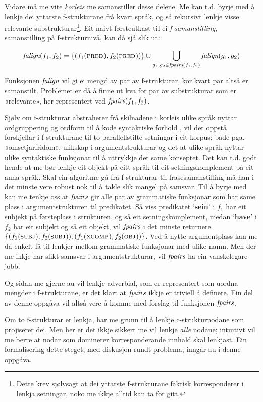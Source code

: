 \documentclass[11pt,a4paper,oneside,draft]{report}
\newcommand{\F}[2]{\textsc{#1}\ensuremath{_{#2}}}
\newcommand{\OBJ}{\F{obj}{}}
\newcommand{\XCOMP}{\F{xcomp}{}}
\newcommand{\SUBJ}{\F{subj}{}}
\newcommand{\PRED}{\F{pred}{}}
\newcommand{\falign}{\ensuremath{\operatorname{\emph{falign}}}}
\newcommand{\fpairs}{\ensuremath{\operatorname{\emph{fpairs}}}}
\newcommand{\p}[1]{`\textbf{#1}'}
\begin{document}
Vidare må me vite \emph{korleis} me samanstiller desse delene. Me kan
t.d. byrje med å lenkje dei yttarste f-strukturane frå kvart språk, og
så rekursivt lenkje visse relevante substrukturar\footnote{Dette krev sjølvsagt at dei yttarste f-strukturane faktisk
        korresponderer i lenkja setningar, noko me ikkje alltid kan ta
        for gitt. }.  Eit naivt
førsteutkast til ei \emph{f-samanstilling}, samanstilling på
f-strukturnivå, kan då sjå slik ut:


\[
\falign(f_{1}, f_{2}) =
\{ (f_{1}(\PRED), f_{2}(\PRED)) \}
\cup
\bigcup_{g_{1},g_{2}\in \fpairs(f_{1},f_{2})} \falign(g_{1}, g_{2})
\]

Funksjonen \falign{} vil gi ei mengd av par av f-strukturar, kor kvart
par altså er samanstilt. Problemet er då å finne ut kva for par av
substrukturar som er «relevante», her representert ved
$\fpairs(f_{1},f_{2})$.


Sjølv om f-strukturar abstraherer frå skilnadene i korleis ulike språk
nyttar ordgruppering og ordform til å kode syntaktiske forhold
\citep[s.~14]{bresnan2001lfs}, vil det  oppstå forskjellar i
f-strukturane til to parallellstilte setningar i eit korpus; både
pga. «omsetjarfridom», ulikskap i argumentstrukturar og det at ulike
språk nyttar ulike syntaktiske funksjonar til å uttrykkje det same
konseptet. Det kan t.d. godt hende at me bør lenkje eit objekt på eitt
språk til eit setningskomplement på eit anna språk. Skal ein algoritme
gå frå f-strukturar til frasesamanstilling må han i det minste vere
robust nok til å takle slik mangel på samsvar. Til å byrje med kan me
tenkje oss at \fpairs{} gir alle par av grammatiske funksjonar som har
same plass i argumentstrukturen til predikatet. Så viss predikatet
\p{sein} i $f_1$ har eit subjekt på førsteplass i strukturen, og så
eit setningskomplement, medan \p{have} i $f_2$ har eit subjekt og så
eit objekt, vil \fpairs{} i det minste returnere
$\{(f_{1}(\SUBJ),f_{2}(\SUBJ)),(f_{1}(\XCOMP),f_{2}(\OBJ))\}$.  Ved å
nytte argumentplass kan me då enkelt få til lenkjer mellom grammatiske
funksjonar med ulike namn.  Men der me ikkje har slikt samsvar i
argumentstrukturar, vil \fpairs{} ha ein vanskelegare jobb.

Og sidan me gjerne au vil lenkje adverbial, som er representert som
uordna mengder i f-strukturane, er det klart at \fpairs{} ikkje er
triviell å definere. Ein del av denne oppgåva vil altså vere å komme
med forslag til funksjonen \fpairs{}.

Om to f-strukturar er lenkja, har me grunn til å lenkje
c-strukturnodane som projiserer dei. Men her er det ikkje sikkert me
vil lenkje \emph{alle} nodane; intuitivt vil me berre at nodar som
dominerer korresponderande innhald skal lenkjast.  Ein formalisering
dette steget, med diskusjon rundt problema, inngår au i denne oppgåva.
\end{document}
